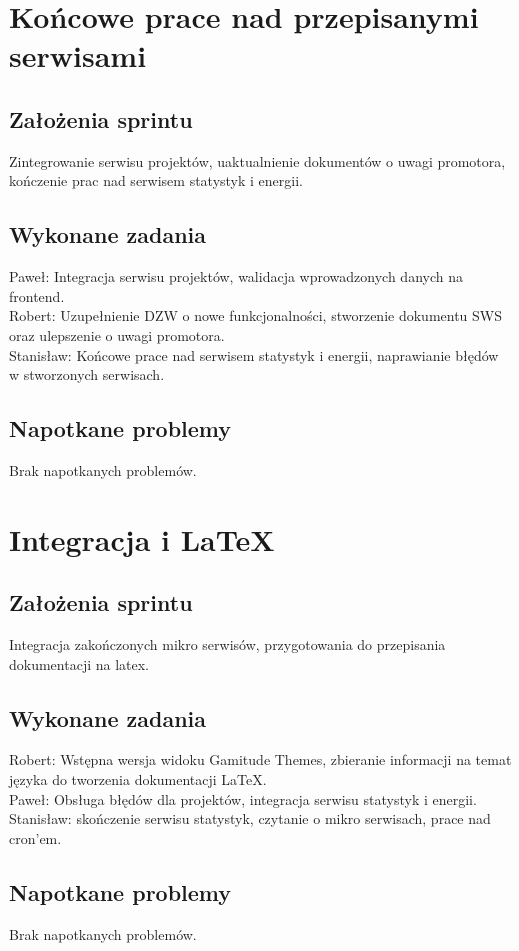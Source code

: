 \documentclass[a4paper,11pt]{report}
\begin{document}
\section {Końcowe prace nad przepisanymi serwisami}
\subsection {Założenia sprintu}
Zintegrowanie serwisu projektów, uaktualnienie dokumentów o uwagi promotora, kończenie prac nad serwisem statystyk i energii.
\subsection {Wykonane zadania}
Paweł: Integracja serwisu projektów, walidacja wprowadzonych danych na frontend.\\
Robert: Uzupełnienie DZW o nowe funkcjonalności, stworzenie dokumentu SWS oraz ulepszenie o uwagi promotora.\\
Stanisław: Końcowe prace nad serwisem statystyk i energii, naprawianie błędów w stworzonych serwisach.\\
\subsection {Napotkane problemy}
Brak napotkanych problemów.

\section {Integracja i LaTeX}
\subsection {Założenia sprintu}
Integracja zakończonych mikro serwisów, przygotowania do przepisania dokumentacji na latex.
\subsection {Wykonane zadania}
Robert: Wstępna wersja widoku Gamitude Themes, zbieranie informacji na temat języka do tworzenia dokumentacji LaTeX.\\
Paweł: Obsługa błędów dla projektów, integracja serwisu statystyk i energii.\\
Stanisław: skończenie serwisu statystyk, czytanie o mikro serwisach, prace nad cron'em.\\
\subsection {Napotkane problemy}
Brak napotkanych problemów.
\end{document}
